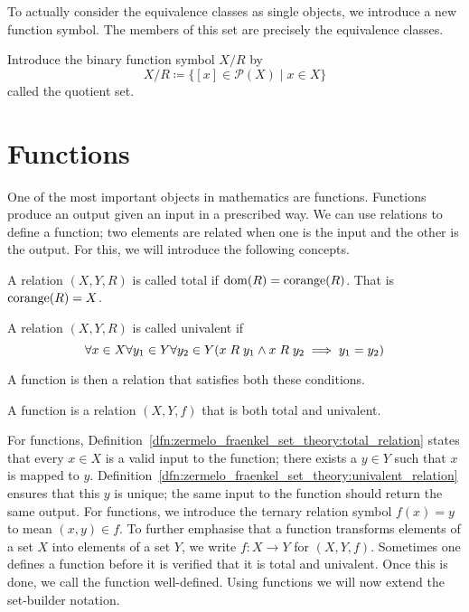 \documentclass[../main.tex]{subfiles}
\begin{document}
To actually consider the equivalence classes as single objects, we introduce a new function symbol. The members of this set are precisely the equivalence classes.
\begin{definition}
    Introduce the binary function symbol $X/R$ by
    \begin{equation*}
        X/R\coloneq\{[x]\in\mathcal{P}(X)\mid x\in X\}
    \end{equation*}
    called the quotient set.
\end{definition}

\section{Functions}\label{sec:zermelo_fraenkel_set_theory:functions}
One of the most important objects in mathematics are functions. Functions produce an output given an input in a prescribed way. We can use relations to define a function; two elements are related when one is the input and the other is the output. For this, we will introduce the following concepts.
\begin{definition}\label{dfn:zermelo_fraenkel_set_theory:total_relation}
    A relation $(X,Y,R)$ is called total if $\dom(R)\linebreak=\corange(R)$. That is $\operatorname{corange}(R)=X$.
\end{definition}
\begin{definition}\label{dfn:zermelo_fraenkel_set_theory:univalent_relation}
    A relation $(X,Y,R)$ is called univalent if
    \begin{equation*}
        \forall x\in X\forall y_1\in Y\forall y_2\in Y(x\mathrel{R} y_1\land x\mathrel{R} y_2\implies y_1=y_2)
    \end{equation*}
\end{definition}
A function is then a relation that satisfies both these conditions.
\begin{definition}[Function]
    A function is a relation $(X,Y,f)$ that is both total and univalent.
\end{definition}
For functions, Definition~\ref{dfn:zermelo_fraenkel_set_theory:total_relation} states that every $x\in X$ is a valid input to the function; there exists a $y\in Y$ such that $x$ is mapped to $y$. Definition~\ref{dfn:zermelo_fraenkel_set_theory:univalent_relation} ensures that this $y$ is unique; the same input to the function should return the same output. For functions, we introduce the ternary relation symbol $f(x)=y$ to mean $(x,y)\in f$. To further emphasise that a function transforms elements of a set $X$ into elements of a set $Y$, we write $f:X\to Y$ for $(X,Y,f)$. Sometimes one defines a function before it is verified that it is total and univalent. Once this is done, we call the function well-defined. Using functions we will now extend the set-builder notation.
\end{document}
